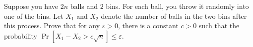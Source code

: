 \problem{}
Suppose you have $2n$ balls and 2 bins.  For each ball, you throw it randomly into one of the bins.  Let $X_1$ and $X_2$ denote the number of balls in the two bins after this process.  Prove that for any  $\varepsilon>0$,  there is a constant  $c>0$  such that the probability $\operatorname{Pr}\left[X_{1}-X_{2}>c \sqrt{n}\right] \leq \varepsilon.$

\solution{}











\newpage